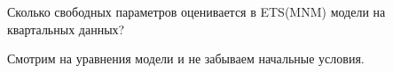 
\begin{question}
Сколько свободных параметров оценивается в ETS(MNM) модели на квартальных данных?
\end{question}

\begin{solution}
Смотрим на уравнения модели и не забываем начальные условия.
\end{solution}

